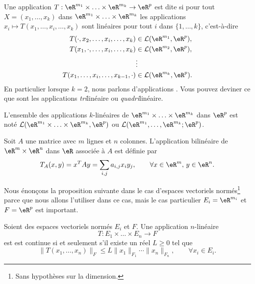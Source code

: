 \begin{definition}       \label{DefFRHooKnPCT}
    Une application $T: \eR^{m_1}\times \ldots \times\eR^{m_k}\to\eR^p $ est dite  si pour tout $X=(x_1, \ldots,x_k)$ dans $ \eR^{m_1}\times \ldots \times\eR^{m_k}$ les applications $x_i\mapsto T(x_1, \ldots, x_i,\ldots,x_k)$ sont linéaires pour tout $i$ dans $\{1,\ldots,k\}$, c'est-à-dire
	\begin{equation}
		\begin{aligned}[]
			T(\cdot,x_2, \ldots, x_i,\ldots,x_k)&\in \mathcal{L}(\eR^{m_1}, \eR^p),\\
			T(x_1,\cdot, \ldots, x_i,\ldots,x_k)&\in \mathcal{L}(\eR^{m_2}, \eR^p),\\
						& \vdots\\
			T(x_1, \ldots, x_i,\ldots,x_{k-1},\cdot)&\in \mathcal{L}(\eR^{m_k}, \eR^p).\\
		\end{aligned}
	\end{equation}
	En particulier lorsque $k=2$, nous parlons d'applications . Vous pouvez deviner ce que sont les applications \emph{tri}linéaire ou \emph{quadri}linéaire.
\end{definition}

L'ensemble des applications $k$-linéaires de $ \eR^{m_1}\times \ldots \times\eR^{m_k}$ dans $\eR^p$ est noté $\mathcal{L}(\eR^{m_1}\times \ldots \times\eR^{m_k}, \eR^p)$ ou $\mathcal{L}(\eR^{m_1}, \ldots,\eR^{m_k}; \eR^p)$.

\begin{example}
  Soit $A$ une matrice avec $m$ lignes et $n$ colonnes. L'application bilinéaire de $\eR^m\times \eR^n$ dans $\eR$ associée à $A$ est définie par
\[
T_A(x,y)= x^TAy=\sum_{i,j}a_{i,j}x_i y_j, \qquad \forall x\in \eR^m, \, y \in \eR^n.
\]
\end{example}

Nous énonçons la proposition suivante dans le cas d'espaces vectoriels normés\footnote{Sans hypothèses sur la dimension.} parce que nous allons l'utiliser dans ce cas, mais le cas particulier \( E_i=\eR^{m_i}\) et \( F=\eR^p\) est important.
\begin{proposition} \label{PropUADlSMg}
    Soient des espaces vectoriels normés \( E_i\) et \( F\). Une application \( n\)-linéaire
    \begin{equation}
        T\colon E_1\times\ldots\times E_n\to F
    \end{equation}
    est est continue si et seulement s'il existe un réel $L\geq 0$ tel que
  \begin{equation}\label{limitatezza}
     \|T(x_1, \ldots,x_n)\|_F\leq L \|x_1\|_{F_1}\cdots\|x_n\|_{F_n}, \qquad \forall x_i\in E_i.
  \end{equation}
\end{proposition}

